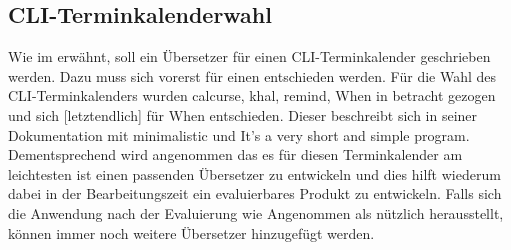 \subsection{CLI-Terminkalenderwahl}\label{section:tech:sub:cli_terminkalender}%
Wie im  erwähnt, soll ein Übersetzer für einen CLI-Terminkalender geschrieben werden. Dazu muss sich vorerst für einen entschieden werden.\newline%
Für die Wahl des CLI-Terminkalenders wurden calcurse\cite{cli_calcurse}, khal\cite{cli_khal}, remind\cite{cli_remind}, When\cite{cli_when} in betracht gezogen und sich [letztendlich] für When entschieden. Dieser beschreibt sich in seiner Dokumentation mit \glqq minimalistic\grqq{} und \glqq It's a very short and simple program\grqq{}\cite{cli_when}. Dementsprechend wird angenommen das es für diesen Terminkalender am leichtesten ist einen passenden Übersetzer zu entwickeln und dies hilft wiederum dabei in der Bearbeitungszeit ein evaluierbares Produkt zu entwickeln.\newline%
%
Falls sich die Anwendung nach der Evaluierung wie Angenommen als nützlich herausstellt, können immer noch weitere Übersetzer hinzugefügt werden. 
